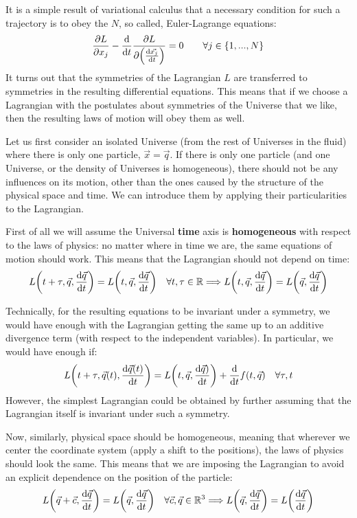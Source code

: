 \documentclass[11pt, a4paper]{article} %
\newcommand{\R}{\mathbb{R}} %
\DeclareRobustCommand{\mybox}[2][gray!10]{%
\begin{tcolorbox}[   %
        left=0.2cm,
        right=0.2cm,
        top=0.15cm,
        bottom=0.15cm,
        colback=#1,
        colframe=#1,
        width=\dimexpr\textwidth\relax, 
        enlarge left by=0mm,
        boxsep=5pt,
        arc=0pt,outer arc=0pt,
        ]
        #2
\end{tcolorbox}
}
\begin{document}
It is a simple result of variational calculus that a necessary condition for such a trajectory is to obey the $N$, so called, Euler-Lagrange equations:
\begin{equation}
\pdv{L}{x_j}-\dv{}{t}\pdv{L}{\qty(\dv{\vec{x_j}}{t})}=0\quad \quad \forall j\in\{1,...,N\}
\end{equation}
It turns out that the symmetries of the Lagrangian $L$ are transferred to symmetries in the resulting differential equations. This means that if we choose a Lagrangian with the postulates about symmetries of the Universe that we like, then the resulting laws of motion will obey them as well.

Let us first consider an isolated Universe (from the rest of Universes in the fluid) where there is only one particle, $\vec{x}=\vec{q}$. If there is only one particle (and one Universe, or the density of Universes is homogeneous), there should not be any influences on its motion, other than the ones caused by the structure of the physical space and time. We can introduce them by applying their particularities to the Lagrangian. 

First of all we will assume the Universal {\bf time} axis is {\bf homogeneous} with respect to the laws of physics: no matter where in time we are, the same equations of motion should work. This means that the Lagrangian should not depend on time:
\begin{equation}
L\qty(t+\tau, \vec{q}, \dv{\vec{q}}{t})=L\qty(t, \vec{q}, \dv{\vec{q}}{t})\quad \forall t,\tau\in \R \Longrightarrow L\qty(t, \vec{q}, \dv{\vec{q}}{t})=L\qty(\vec{q}, \dv{\vec{q}}{t})
\end{equation}
\mybox{
Technically, for the resulting equations to be invariant under a symmetry, we would have enough with the Lagrangian getting the same up to an additive divergence term (with respect to the independent variables). In particular, we would have enough if:
\begin{equation}
L\qty(t+\tau, \vec{q}(t), \dv{\vec{q}(t)}{t})=L\qty(t, \vec{q}, \dv{\vec{q})}{t})+\dv{}{t}f(t,\vec{q})\quad \forall \tau,t
\end{equation}
However, the simplest Lagrangian could be obtained by further assuming that the Lagrangian itself is invariant under such a symmetry.
}
Now, similarly, physical space should be homogeneous, meaning that wherever we center the coordinate system (apply a shift to the positions), the laws of physics should look the same. This means that we are imposing the Lagrangian to avoid an explicit dependence on the position of the particle:
\begin{equation}
L\qty( \vec{q}+\vec{c}, \dv{\vec{q}}{t})=L\qty( \vec{q}, \dv{\vec{q}}{t})\quad \forall \vec{c},\vec{q}\in \R^3 \Longrightarrow L\qty( \vec{q}, \dv{\vec{q}}{t})=L\qty( \dv{\vec{q}}{t})
\end{equation}
\end{document}
